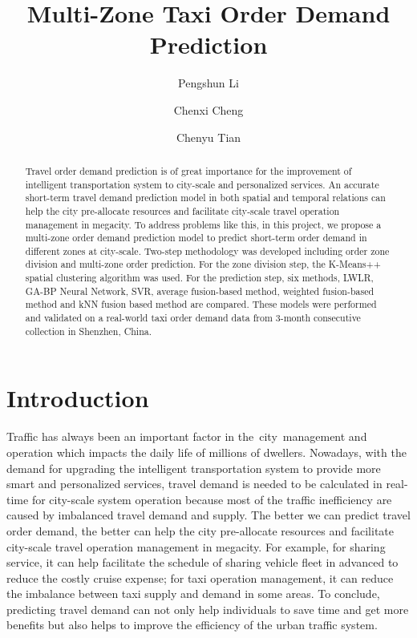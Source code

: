 \documentclass[sigconf]{acmart}
\makeatletter
\newcounter{pagecount}
\newcommand{\limitpages}[1]{
    \setcounter{pagecount}{0}%
    \gdef\maxpages{#1}%
    \ifx\latex@outputpage\@undefined\relax%
        \global\let\latex@outputpage\@outputpage%
    \fi%
    \gdef\@outputpage{%
        \addtocounter{pagecount}{1}%
        \ifnum\value{pagecount}>\maxpages\relax%
        \else%
            \latex@outputpage%
        \fi%
    }%
}
\makeatother
\begin{document}
\limitpages{10}

\title{Multi-Zone Taxi Order Demand Prediction}

\author{Pengshun Li}

\author{Chenxi Cheng}

\author{Chenyu Tian}


\begin{abstract}
  Travel order demand prediction is of great importance for the improvement of intelligent transportation system to city-scale and personalized services. An accurate short-term travel demand prediction model in both spatial and temporal relations can help the city pre-allocate resources and facilitate city-scale travel operation management in megacity. 
  To address problems like this, in this project, we propose a multi-zone order demand prediction model to predict short-term order demand in different zones at city-scale. Two-step methodology was developed including order zone division and multi-zone order prediction. For the zone division step, the K-Means++ spatial clustering algorithm was used. For the prediction step, six methods, LWLR, GA-BP Neural Network, SVR, average fusion-based method, weighted fusion-based method and kNN fusion based method are compared.
  These models were performed and validated on a real-world taxi order demand data from 3-month consecutive collection in Shenzhen, China.
\end{abstract}

\maketitle

\section{Introduction}
Traffic has always been an important factor in the city management and operation which impacts the daily life of millions of dwellers. Nowadays, with the demand for upgrading the intelligent transportation system to provide more smart and personalized services, travel demand is needed to be calculated in real-time for city-scale system operation because most of the traffic inefficiency are caused by imbalanced travel demand and supply. The better we can predict travel order demand, the better can help the city pre-allocate resources and facilitate city-scale travel operation management in megacity. For example, for sharing service, it can help facilitate the schedule of sharing vehicle fleet in advanced to reduce the costly cruise expense; for taxi operation management, it can reduce the imbalance between taxi supply and demand in some areas. To conclude, predicting travel demand can not only help individuals to save time and get more benefits but also helps to improve the efficiency of the urban traffic system.
\end{document}
